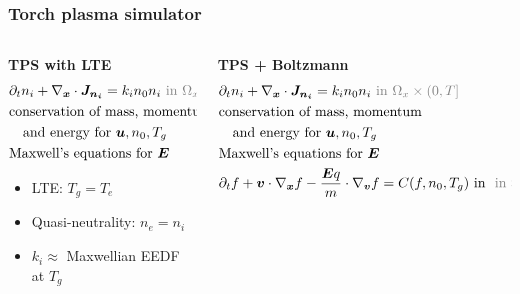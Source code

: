 \documentclass[mathserif, aspectratio=169]{beamer}
\newcommand{\vect}[1]{\boldsymbol{#1}}
\begin{document}
\begin{frame}
	\frametitle{Torch plasma simulator}
	\begin{columns}
		\begin{column}{0.48\textwidth}
			\textbf{TPS with LTE}
			\footnotesize
			\begin{align*}
				&\partial_t n_i + \nabla_{\vect{x}} \cdot \vect{J_{n_i}}  = k_i n_0 n_i  \color{gray}{\text{ in } \Omega_x \times (0,T]}\\
				&\text{conservation of mass, momentum} \\
				&\quad  \text{and energy for } \vect{u}, n_0, T_g \\
				&\text{Maxwell's equations for } \vect{E}
			\end{align*}
			\begin{itemize}
				\item LTE: $T_g=T_e$ %
				\item Quasi-neutrality: $n_e = n_i$ 
				\item $k_i \approx$ Maxwellian EEDF at $T_g$
			\end{itemize}
		\end{column}
		\begin{column}{0.48\textwidth}
			\textbf{TPS + Boltzmann}
			\footnotesize
			\begin{align*}
				&\partial_t n_i + \nabla_{\vect{x}} \cdot \vect{J_{n_i}}  = k_i n_0 n_i  \color{gray}{\text{ in } \Omega_x \times (0,T]}\\
				&\text{conservation of mass, momentum} \\
				&\quad  \text{and energy for } \vect{u}, n_0, T_g \\
				&\text{Maxwell's equations for } \vect{E}\\
				&\partial_t f  + \vect{v} \cdot \nabla_{\vect{x}} f -\frac{\vect{E} q}{m} \cdot \nabla_{\vect{v }}f = C(f, n_0, T_g) \text{ in } \color{gray}{\text{ in } \Omega_x \Omega_v \times (0,T]}

\end{align*}
\end{column}
\end{columns}
\end{frame}
\end{document}
